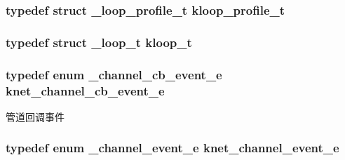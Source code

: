 \subsubsection[{kloop\+\_\+profile\+\_\+t}]{\setlength{\rightskip}{0pt plus 5cm}typedef struct {\bf \+\_\+loop\+\_\+profile\+\_\+t} {\bf kloop\+\_\+profile\+\_\+t}}\label{a00066_ab75a5c23099a6118c469ed160b277f28_ab75a5c23099a6118c469ed160b277f28}
\hypertarget{a00066_a97fc76209a58362019f1ded9169e397f_a97fc76209a58362019f1ded9169e397f}{}
\subsubsection[{kloop\+\_\+t}]{\setlength{\rightskip}{0pt plus 5cm}typedef struct {\bf \+\_\+loop\+\_\+t} {\bf kloop\+\_\+t}}\label{a00066_a97fc76209a58362019f1ded9169e397f_a97fc76209a58362019f1ded9169e397f}
\hypertarget{a00066_a2fd2faf971268f5b682ab375c455f7c9_a2fd2faf971268f5b682ab375c455f7c9}{}
\subsubsection[{knet\+\_\+channel\+\_\+cb\+\_\+event\+\_\+e}]{\setlength{\rightskip}{0pt plus 5cm}typedef enum {\bf \+\_\+channel\+\_\+cb\+\_\+event\+\_\+e}  {\bf knet\+\_\+channel\+\_\+cb\+\_\+event\+\_\+e}}\label{a00066_a2fd2faf971268f5b682ab375c455f7c9_a2fd2faf971268f5b682ab375c455f7c9}
管道回调事件 \hypertarget{a00066_accd62b4c787cfb91e81aa14210302863_accd62b4c787cfb91e81aa14210302863}{}
\subsubsection[{knet\+\_\+channel\+\_\+event\+\_\+e}]{\setlength{\rightskip}{0pt plus 5cm}typedef enum {\bf \+\_\+channel\+\_\+event\+\_\+e}  {\bf knet\+\_\+channel\+\_\+event\+\_\+e}}\label{a00066_accd62b4c787cfb91e81aa14210302863_accd62b4c787cfb91e81aa14210302863}
\hypertarget{a00066_a8a7d96123ef4565c6d08fe58a10476a9_a8a7d96123ef4565c6d08fe58a10476a9}{}

